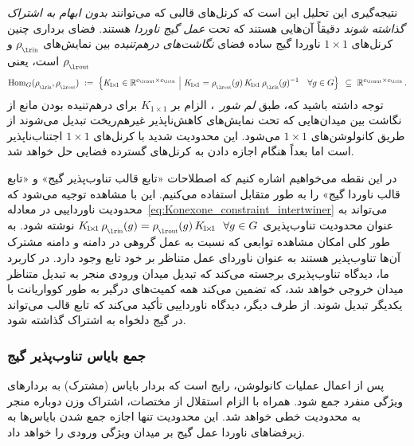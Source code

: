 نتیجه‌گیری این تحلیل این است که کرنل‌های قالبی که می‌توانند \emph{بدون ابهام به اشتراک گذاشته شوند} دقیقاً آن‌هایی هستند که تحت \emph{عمل گیج ناوردا} هستند.
فضای برداری چنین کرنل‌های $1\times1$ ناوردا گیج ساده فضای \emph{نگاشت‌های درهم‌تنیده} بین نمایش‌های $\rhoin$ و $\rhoout$ است، یعنی
\begin{align}\label{eq:gauge_onexone_solution_space}
	\Hom_G(\rhoin,\rhoout)\ :=\ 
	\pig\{ K_{\!1\!\times\!1} \in \R^{\cout\times\cin}\ \pig|\ 
	K_{\!1\!\times\!1} = \rhoout(g)\, K_{\!1\!\times\!1}\, \rhoin(g)^{-1}\ \ \ \forall g\in G \pig\}
	\,\ \subseteq\ \R^{\cout\times\cin} \,.
\end{align}
توجه داشته باشید که، طبق \emph{لم شور}~\cite{gallier2019harmonicRepr}، الزام بر $K_{\!1\!\times\!1}$ برای درهم‌تنیده بودن مانع از نگاشت بین میدان‌هایی که تحت نمایش‌های کاهش‌ناپذیر غیرهم‌ریخت تبدیل می‌شوند از طریق کانولوشن‌های $1\times1$ می‌شود.
این محدودیت شدید با کرنل‌های $1\times1$ اجتناب‌ناپذیر است اما بعداً هنگام اجازه دادن به کرنل‌های گسترده فضایی حل خواهد شد.

در این نقطه می‌خواهیم اشاره کنیم که اصطلاحات «تابع قالب تناوب‌پذیر گیج» و «تابع قالب ناوردا گیج» را به طور متقابل استفاده می‌کنیم.
این با مشاهده توجیه می‌شود که محدودیت ناورداییی در معادله~\eqref{eq:Konexone_constraint_intertwiner} می‌تواند به عنوان محدودیت تناوب‌پذیری
$K_{\!1\!\times\!1}\, \rhoin(g) = \rhoout(g)\, K_{\!1\!\times\!1}\ \ \forall g\in G$
نوشته شود.
به طور کلی امکان مشاهده توابعی که نسبت به عمل گروهی در دامنه و دامنه مشترک آن‌ها تناوب‌پذیر هستند به عنوان ناوردای عمل متناظر بر خود تابع وجود دارد.
در کاربرد ما، دیدگاه تناوب‌پذیری برجسته می‌کند که تبدیل میدان ورودی منجر به تبدیل متناظر میدان خروجی خواهد شد، که تضمین می‌کند همه کمیت‌های درگیر به طور کوواریانت با یکدیگر تبدیل شوند.
از طرف دیگر، دیدگاه ناورداییی تأکید می‌کند که تابع قالب می‌تواند در گیج دلخواه به اشتراک گذاشته شود.


\subsubsection{جمع بایاس تناوب‌پذیر گیج}
\label{sec:gauge_bias_summation}


پس از اعمال عملیات کانولوشن، رایج است که بردار بایاس (مشترک) به بردارهای ویژگی منفرد جمع شود.
همراه با الزام استقلال از مختصات، اشتراک وزن دوباره منجر به محدودیت خطی خواهد شد.
این محدودیت تنها اجازه جمع شدن بایاس‌ها به زیرفضاهای ناوردا عمل گیج بر میدان ویژگی ورودی را خواهد داد.


